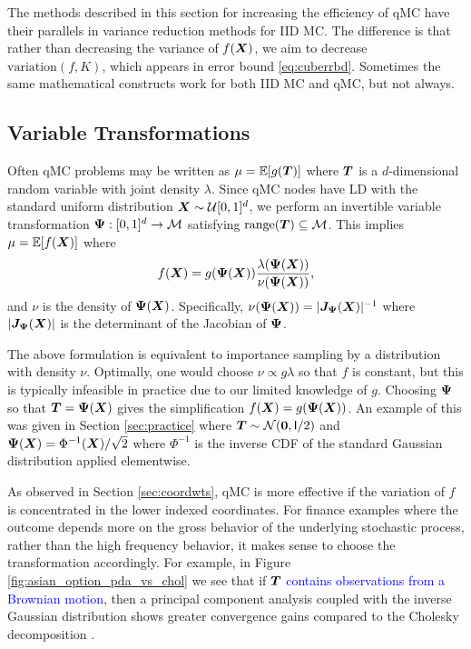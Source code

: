 \documentclass{svproc}
\newcommand{\FJHNote}[1]{{\textcolor{blue}{#1}}}
\begin{document}
The methods described in this section for increasing the efficiency of qMC have their parallels in variance reduction methods for IID MC.  The difference is that rather than decreasing the variance of $f({\boldsymbol{X}})$, we aim to decrease  $\text{variation}(f,K)$, which appears in error bound \eqref{eq:cuberrbd}. Sometimes the same mathematical constructs work for both IID MC and qMC, but not always.



\subsection{Variable Transformations} 

Often qMC problems may be written as $\mu = {\mathbb{E}}[g({\boldsymbol{T}})]$ where ${\boldsymbol{T}}$ is a $d$-dimensional random variable with joint density $\lambda$. Since qMC nodes have LD with the standard uniform distribution ${\boldsymbol{X}} \sim {\mathcal{U}}[0,1]^d$, we perform an invertible variable transformation ${\boldsymbol{\Psi}}: [0,1]^d \to {\mathcal{M}}$ satisfying $\mathrm{range}({\boldsymbol{T}}) \subseteq {\mathcal{M}}$. This implies
$\mu = {\mathbb{E}}[f({\boldsymbol{X}})]$ where  
$$
f({\boldsymbol{X}}) = g({\boldsymbol{\Psi}}({\boldsymbol{X}})) \frac{\lambda ({\boldsymbol{\Psi}}({\boldsymbol{X}}))}{\nu({\boldsymbol{\Psi}}({\boldsymbol{X}}))},
$$
and $\nu$ is the density of ${\boldsymbol{\Psi}}({\boldsymbol{X}})$. Specifically, $\nu({\boldsymbol{\Psi}}({\boldsymbol{X}}))= \lvert {\boldsymbol{J}}_{\boldsymbol{\Psi}}({\boldsymbol{X}}) \rvert^{-1}$ where $\lvert {\boldsymbol{J}}_{\boldsymbol{\Psi}}({\boldsymbol{X}}) \rvert$ is the determinant of the Jacobian of ${\boldsymbol{\Psi}}$. 

The above formulation is equivalent to importance sampling by a distribution with density $\nu$. Optimally, one would choose $\nu \propto g\lambda$ so that $f$ is constant, but this is typically infeasible in practice due to our limited knowledge of $g$. Choosing ${\boldsymbol{\Psi}}$ so that ${\boldsymbol{T}} = {\boldsymbol{\Psi}}({\boldsymbol{X}})$ gives the simplification $f({\boldsymbol{X}}) = g({\boldsymbol{\Psi}}({\boldsymbol{X}}))$. An example of this was given in Section \ref{sec:practice} where ${\boldsymbol{T}} \sim {\mathcal{N}}(\boldsymbol{0},\mathsf{I}/2)$ and ${\boldsymbol{\Psi}}({\boldsymbol{X}}) = \Phi^{-1}({\boldsymbol{X}})/\sqrt{2}$ where $\Phi^{-1}$ is the inverse CDF of the standard Gaussian distribution applied elementwise.

As observed in Section \ref{sec:coordwts}, qMC is more effective if the variation of $f$ is concentrated in the lower indexed coordinates.  For finance examples where the outcome depends more on the gross behavior of the underlying stochastic process, rather than the high frequency behavior, it makes sense to choose the transformation accordingly. For example, in Figure \ref{fig:asian_option_pda_vs_chol} we see that if  ${\boldsymbol{T}}$ \FJHNote{contains observations from a Brownian motion}, then a principal component analysis coupled with the inverse Gaussian distribution shows greater convergence gains compared to the Cholesky decomposition \cite{AcwBroGla97}.
\end{document}
